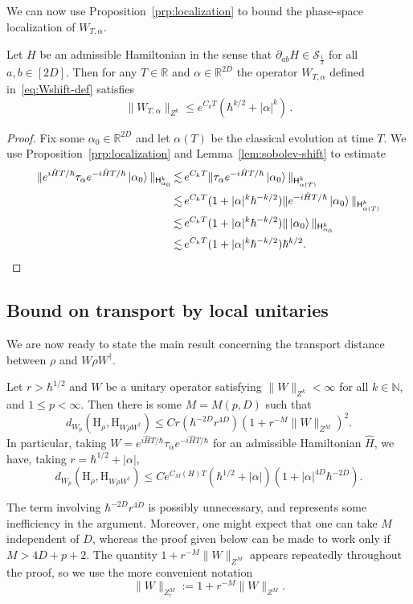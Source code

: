 \documentclass[11pt]{amsart}
\def\Husimi{{\mathrm{H}}}
\def\Sobolev{{\mathsf{H}}}
\def\bbN{{\mathbb{N}}}
\def\Real{{\mathbb R}}
\def\lsim{{\,\lesssim\,}}
\newcommand{\mcal}[1]{{\mathcal{#1}}}
\def\ket#1{\mathinner{|{#1}\rangle}}
\numberwithin{equation}{section}
\begin{document}
We can now use Proposition~\ref{prp:localization} to bound the phase-space localization of $W_{T,\alpha}$.
\begin{lemma}
Let $H$ be an admissible Hamiltonian in the sense that $\partial_{ab} H\in\mcal{S}_{\frac12}$ for all $a,b\in [2D]$.
Then for any $T\in\Real$ and $\alpha\in\Real^{2D}$ the operator $W_{T,\alpha}$ defined in~\eqref{eq:Wshift-def}
satisfies
\[
\|W_{T,\alpha}\|_{Z^k} \leq e^{C_k T}(\hbar^{k/2} + |\alpha|^k)\,.
\]
\end{lemma}
\begin{proof}
Fix some $\alpha_0 \in\Real^{2D}$ and let $\alpha(T)$ be the classical evolution at time $T$.
We use Proposition~\ref{prp:localization} and Lemma~\ref{lem:sobolev-shift} to estimate
\begin{align*}
\|e^{i\hat{H}T/\hbar} \tau_\alpha e^{-i\hat{H}T/\hbar}\ket{\alpha_0}\|_{\Sobolev^k_{\alpha_0}}
&\lsim e^{C_kT} \|\tau_\alpha e^{-i\hat{H}T/\hbar}\ket{\alpha_0}\|_{\Sobolev^k_{\alpha(T)}} \\
&\lsim e^{C_kT}(1 + |\alpha|^k\hbar^{-k/2}) \|e^{-i\hat{H}T/\hbar}\ket{\alpha_0}\|_{\Sobolev^k_{\alpha(T)}} \\
&\lsim e^{C_kT}(1 + |\alpha|^k\hbar^{-k/2}) \|\ket{\alpha_0}\|_{\Sobolev^k_{\alpha_0}} \\
&\lsim e^{C_kT}(1 + |\alpha|^k\hbar^{-k/2}) \hbar^{k/2}.
\end{align*}
\end{proof}


\subsection{Bound on transport by local unitaries}
\label{sec:mainthm}
We are now ready to state the main result concerning the transport distance between $\rho$ and $W\rho W^\dagger$.
\begin{theorem}
\label{thm:main-husimi}
Let $r>\hbar^{1/2}$ and $W$ be a unitary operator satisfying $\|W\|_{Z^k} <\infty$ for all $k\in\bbN$, and $1\leq p<\infty$.   Then there is some $M=M(p,D)$ such that
\[
d_{W_p}(\Husimi_\rho, \Husimi_{W\rho W^\dagger}) \leq Cr (\hbar^{-2D} r^{4D})(1 + r^{-M}\|W\|_{Z^M})^2.
\]
In particular, taking $W=e^{i\hat{H}T/\hbar} \tau_\alpha e^{-i\hat{H}T/\hbar}$ for an admissible Hamiltonian
$\hat{H}$, we have, taking $r = \hbar^{1/2} + |\alpha|$,
\begin{equation}
\label{eq:husimi-shift}
d_{W_p}(\Husimi_\rho, \Husimi_{W\rho W^\dagger}) \leq Ce^{C_M(H) T}
(\hbar^{1/2} + |\alpha|)(1 + |\alpha|^{4D} \hbar^{-2D}).
\end{equation}
\end{theorem}
The term involving $\hbar^{-2D}r^{4D}$ is possibly unnecessary, and represents some inefficiency
in the argument.  Moreover, one might expect that one can take $M$ independent of $D$, whereas
the proof given below can be made to work only if $M>4D+p+2$.
The quantity $1 + r^{-M} \|W\|_{Z^M}$ appears repeatedly throughout the proof, so we use the more convenient
notation
\[
\|W\|_{Z^M_r} := 1 + r^{-M} \|W\|_{Z^M}.
\]
\end{document}

